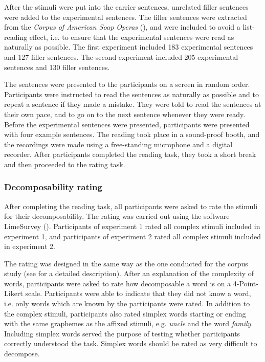 
After the stimuli were put into the carrier sentences, unrelated filler sentences were added to the experimental sentences. The filler sentences were extracted from the \textit{Corpus of American Soap Operas} (\citealt{Davies.2011}), and were included  to avoid a list-reading effect, i.e. to ensure that the experimental sentences were read as naturally as possible. The first experiment included 183 experimental sentences and 127 filler sentences. The second experiment included 205 experimental sentences and 130 filler sentences. 

The sentences were presented to the participants on a screen in random order. 
Participants were instructed to read the sentences as naturally as possible and to repeat a sentence if they made a mistake. They were told to read the sentences at their own pace, and to go on to the next sentence whenever they were ready. Before the experimental sentences were presented, participants were presented with four example sentences. 
The reading took place in a sound-proof booth, and the recordings were made using a free-standing microphone and a digital recorder.
 After participants completed the reading task, they took a short break and then proceeded to the rating task.




\subsubsection{Decomposability rating}


After completing the reading task, all participants were asked to rate the stimuli for their decomposability. The rating was carried out using the software LimeSurvey (\citealt{LimeSurveyProjectTeam.2015}). Participants of experiment 1 rated all complex stimuli included in experiment 1, and participants of experiment 2 rated all complex stimuli included in experiment 2. 

The rating was designed in the same way as the one conducted for the corpus study (see  for a detailed description). After an explanation of the complexity of words, participants were asked to rate how decomposable a word is on a 4-Point-Likert scale. Participants were able to indicate that they did not know a word, i.e. only words which are known by the participants were rated. In addition to the complex stimuli, participants also rated simplex words starting or ending with the same graphemes as the affixed stimuli, e.g. \textit{{un}cle} and the word \textit{fami{ly}}. Including simplex words served the purpose of testing whether participants correctly understood the task. Simplex words should be rated as very difficult to decompose. 





